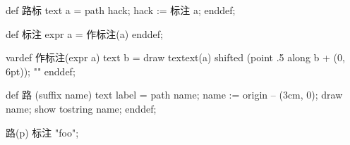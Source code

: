 \usemodule[zhfonts]
%
\startMPinclusions[+]
def 路标 text a =
  path hack; hack := 标注 a;
enddef;

def 标注 expr a =
  作标注(a)
enddef;

vardef 作标注(expr a) text b =
  draw textext(a) shifted (point .5 along b + (0, 6pt));
  ""
enddef;

def 路 (suffix name) text label =
  path name;
  name := origin -- (3cm, 0);
  draw name;
  show tostring name;
enddef;
\stopMPinclusions

路(p) 标注 "foo";
\stopuseMPgraphic

\startTEXpage[offset=4pt]
\hfill{}
\stopTEXpage

